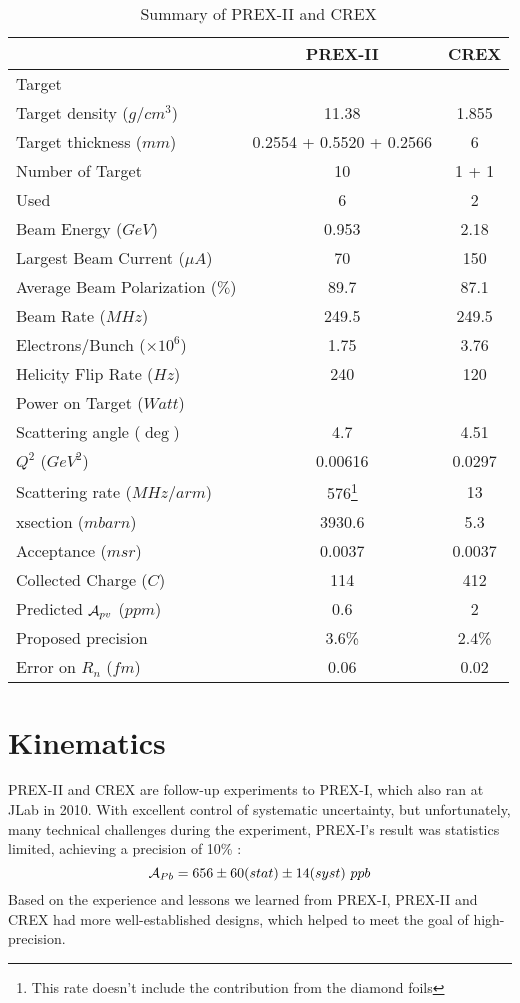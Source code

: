 \begin{table}[h]
    \centering
    \begin{tabular}{l | c c }
	\hline
	&   PREX-II & CREX  \\
	\hline
	Target	& \Pb	& \Ca	\\
	Target density ($g/cm^3$)   & 11.38 & 1.855	\\
	Target thickness ($mm$)	& 0.2554 + 0.5520 + 0.2566	& 6	\\
	Number of Target & 10 & 1 + 1	\\
	Used	& 6 & 2	\\
	\hline
	Beam Energy ($GeV$) & 0.953 & 2.18  \\
	Largest Beam Current ($\mu A$)	& 70	& 150	\\
	Average Beam Polarization ($\%$) & 89.7   & 87.1   \\
	Beam Rate ($MHz$) & 249.5	& 249.5 \\
	Electrons/Bunch	($\times 10^6$)	& 1.75	& 3.76	\\
	Helicity Flip Rate ($Hz$)  & 240   & 120   \\
	Power on Target ($Watt$)	&   &	\\
	\hline
	Scattering angle ($\deg$)   & 4.7	& 4.51 \\
	$Q^2$ ($GeV^2$)	& 0.00616   & 0.0297	\\
	Scattering rate ($MHz/arm$)   & 576\footnote{This rate doesn't include the contribution from the diamond foils}   & 13 \\
	xsection ($mbarn$)    & 3930.6	& 5.3   \\
	Acceptance ($msr$)    &	0.0037 & 0.0037  \\
	\hline
	Collected Charge ($C$)	& 114	& 412	\\
	\hline
	Predicted $\mathcal{A}_{pv}$ ($ppm$)	& 0.6   & 2 \\
	Proposed precision  & 3.6\%   & 2.4\% \\
	Error on $R_n$ ($fm$)	& 0.06	& 0.02	\\
	\hline
    \end{tabular}
    \caption{Summary of PREX-II and CREX}
    \label{tb:parameters}
\end{table}

\section{Kinematics}
PREX-II and CREX are follow-up experiments to PREX-I, which also ran at JLab in 2010. 
With excellent control of systematic uncertainty, but unfortunately, 
many technical challenges during the experiment, PREX-I's result was statistics 
limited, achieving a precision of 10\% \cite{PhysRevLett.108.112502}:
$$ \CA_{Pb} = 656 \pm 60 (stat) \pm 14 (syst) \ ppb$$
Based on the experience and lessons we learned from PREX-I, 
PREX-II and CREX had more well-established designs, which helped to
meet the goal of high-precision.

